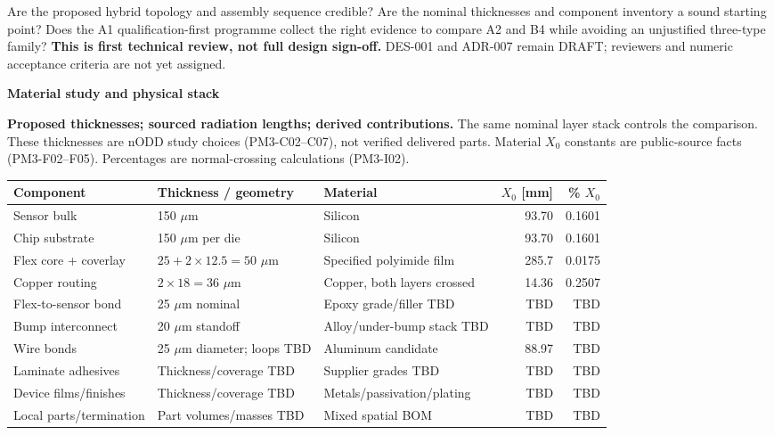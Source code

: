 \documentclass[10pt,a4paper]{article}
\newcommand{\heading}[1]{\vspace{3pt}{\large\bfseries #1}\par}
\begin{document}
\heading{What the reviewer is being asked to assess}
Are the proposed hybrid topology and assembly sequence credible? Are the
nominal thicknesses and component inventory a sound starting point? Does the
A1 qualification-first programme collect the right evidence to compare A2 and
B4 while avoiding an unjustified three-type family?
\textbf{This is first technical review, not full design sign-off.}
DES-001 and ADR-007 remain DRAFT; reviewers and numeric acceptance criteria
are not yet assigned.

\newpage
{\LARGE\bfseries Material study and physical stack}\par
\textbf{Proposed thicknesses; sourced radiation lengths; derived contributions.}
The same nominal layer stack controls the comparison. These thicknesses are
nODD study choices (PM3-C02--C07), not verified delivered parts. Material
$X_0$ constants are public-source facts (PM3-F02--F05). Percentages are
normal-crossing calculations (PM3-I02).

{\small
\begin{tabularx}{\linewidth}{@{}p{35mm}p{32mm}Yrr@{}}
\toprule
\textbf{Component} & \textbf{Thickness / geometry} & \textbf{Material} & \textbf{$X_0$ [mm]} & \textbf{\% $X_0$}\\
\midrule
Sensor bulk & 150 $\mu$m & Silicon & 93.70 & 0.1601\\
Chip substrate & 150 $\mu$m per die & Silicon & 93.70 & 0.1601\\
Flex core + coverlay & $25+2\times12.5=50$ $\mu$m & Specified polyimide film & 285.7 & 0.0175\\
Copper routing & $2\times18=36$ $\mu$m & Copper, both layers crossed & 14.36 & 0.2507\\
Flex-to-sensor bond & 25 $\mu$m nominal & Epoxy grade/filler TBD & TBD & TBD\\
Bump interconnect & 20 $\mu$m standoff & Alloy/under-bump stack TBD & TBD & TBD\\
Wire bonds & 25 $\mu$m diameter; loops TBD & Aluminum candidate & 88.97 & TBD\\
Laminate adhesives & Thickness/coverage TBD & Supplier grades TBD & TBD & TBD\\
Device films/finishes & Thickness/coverage TBD & Metals/passivation/plating & TBD & TBD\\
Local parts/termination & Part volumes/masses TBD & Mixed spatial BOM & TBD & TBD\\
\bottomrule
\end{tabularx}}
\end{document}
